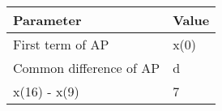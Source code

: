     \begin{tabular}{|p{4cm}|p{3cm}|}
        \hline
        \textbf{Parameter} & \textbf{Value} \\
        \hline
        First term of AP & x(0) \\
        Common difference of AP & d \\
        x(16) - x(9) & 7  \\
        \hline
    \end{tabular}

